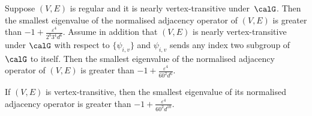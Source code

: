 \begin{proposition}
\label{Cor:AlmostGraphAut}
Suppose $(V, E)$ is regular and it is nearly vertex-transitive under~$\calG$. Then the smallest eigenvalue of the normalised adjacency operator of $(V, E)$ is greater than $-1+ \frac {\varepsilon^4}{2^{8}3^{4}d^6}$. 
Assume in addition that $(V, E)$ is nearly vertex-transitive under $\calG$ with respect to $\{\psi_{i,v}\}$ and $\psi_{i, v}$ sends any index two subgroup of $\calG$ to itself. Then the smallest eigenvalue of the normalised adjacency operator of $(V, E)$ is greater than $ -1+\frac {\varepsilon^4}{60^2 d^6}$. 
\end{proposition}

\begin{proposition}
\label{Cor:SpannSubgraVertexTra}
If $(V, E)$ is vertex-transitive, then the smallest eigenvalue of its normalised adjacency operator is greater than $ -1+\frac {\varepsilon^4}{60^2 d^{10}}$. 
\end{proposition}
